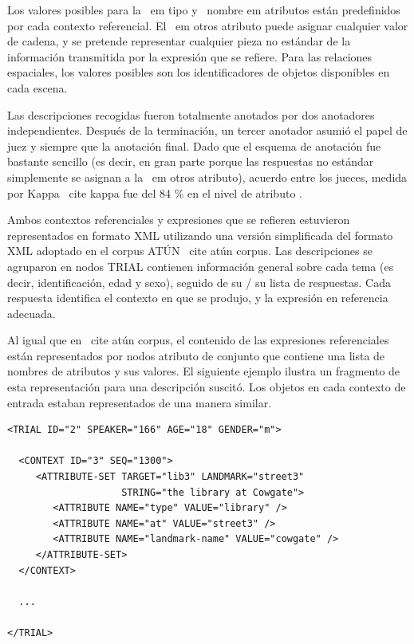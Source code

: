 Los valores posibles para la {\ em tipo} y {\ nombre em} atributos est\'an predefinidos por cada contexto referencial. El {\ em otros} atributo puede asignar cualquier valor de cadena, y se pretende representar cualquier pieza no est\'andar de la informaci\'on transmitida por la expresi\'on que se refiere. Para las relaciones espaciales, los valores posibles son los identificadores de objetos disponibles en cada escena.

Las descripciones recogidas fueron totalmente anotados por dos anotadores independientes. Despu\'es de la terminaci\'on, un tercer anotador asumi\'o el papel de juez y siempre que la anotaci\'on final. Dado que el esquema de anotaci\'on fue bastante sencillo (es decir, en gran parte porque las respuestas no est\'andar simplemente se asignan a la {\ em otros} atributo), acuerdo entre los jueces, medida por Kappa \ cite {kappa} fue del 84 \% en el nivel de atributo .

Ambos contextos referenciales y expresiones que se refieren estuvieron representados en formato XML utilizando una versi\'on simplificada del formato XML adoptado en el corpus AT\'UN \ cite {at\'un corpus}. Las descripciones se agruparon en nodos TRIAL contienen informaci\'on general sobre cada tema (es decir, identificaci\'on, edad y sexo), seguido de su / su lista de respuestas. Cada respuesta identifica el contexto en que se produjo, y la expresi\'on en referencia adecuada.

Al igual que en \ cite {at\'un corpus}, el contenido de las expresiones referenciales est\'an representados por nodos atributo de conjunto que contiene una lista de nombres de atributos y sus valores. El siguiente ejemplo ilustra un fragmento de esta representaci\'on para una descripci\'on suscit\'o. Los objetos en cada contexto de entrada estaban representados de una manera similar.


\tiny{
\begin{verbatim}
<TRIAL ID="2" SPEAKER="166" AGE="18" GENDER="m">

  <CONTEXT ID="3" SEQ="1300">
     <ATTRIBUTE-SET TARGET="lib3" LANDMARK="street3" 
                    STRING="the library at Cowgate">
        <ATTRIBUTE NAME="type" VALUE="library" />
        <ATTRIBUTE NAME="at" VALUE="street3" />
        <ATTRIBUTE NAME="landmark-name" VALUE="cowgate" />
     </ATTRIBUTE-SET>
  </CONTEXT>

  ...
	
</TRIAL>	
\end{verbatim}
}
\normalsize


